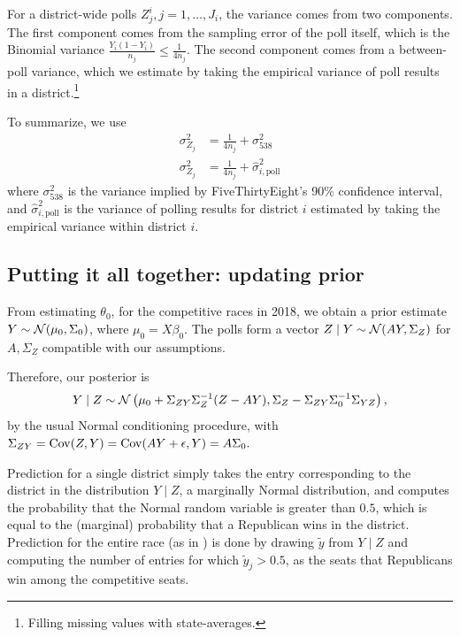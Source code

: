 \documentclass[12pt, letterpaper]{article}
\begin{document}
For a district-wide polls $Z_j^i, j = 1,\ldots,J_i$, the variance comes from two components. The first component comes from the sampling error of the poll itself, which is the Binomial variance $\frac{Y_i(1-Y_i)}{n_j} \le \frac{1}{4n_j}$. The second component comes from a between-poll variance, which we estimate by taking the empirical variance of poll results in a district.\footnote{Filling missing values with state-averages.} 

To summarize, we use \begin{align*}
\sigma^2_{Z_j} &= \frac{1}{4n_j} + \sigma^2_{538} \tag{Estimation for generic ballot poll variance}\\
\sigma^2_{Z_j} &= \frac{1}{4n_j} + \hat\sigma^2_{i,\text{poll}} \tag{Estimation for district poll variance}
\end{align*}
where $ \sigma^2_{538}$ is the variance implied by FiveThirtyEight's 90\% confidence interval, and $\hat\sigma^2_{i,\text{poll}}$ is the variance of polling results for district $i$ estimated by taking the empirical variance within district $i$.

\subsection{Putting it all together: updating prior}
\label{sub:altogether}
From estimating $\theta_0$, for the competitive races in 2018, we obtain a prior estimate $Y \sim \mathcal{N}(\mu_0, \Sigma_0)$, where $\mu_0 = X\beta_0$. The polls form a vector $Z \mid Y \sim \mathcal{N}(AY, \Sigma_Z)$ for $A, \Sigma_Z$ compatible with our assumptions. 
    
Therefore, our posterior is 
\begin{equation}
  Y\mid Z \sim \mathcal{N}\left({
\mu_0 + \Sigma_{ZY} \Sigma_Z^{-1}(Z - AY), \Sigma_Z - \Sigma_{ZY} \Sigma_0^{-1} \Sigma_{YZ}
}\right),
\label{eq:normal_cond}
\end{equation}
by the usual Normal conditioning procedure, with $\Sigma_{ZY} = \operatorname{Cov}(Z, Y) = \operatorname{Cov}(AY + \epsilon, Y) = A\Sigma_0.$

Prediction for a single district simply takes the entry corresponding to the
district in the distribution $Y \mid Z$, a marginally Normal distribution, and
computes the probability that the Normal random variable is greater than $0.5$,
which is equal to the (marginal) probability that a Republican wins in the
district. Prediction for the entire race (as in 
) is done by drawing
$\tilde y$ from $Y \mid Z$ and computing the number of entries for which
$\tilde y_j > 0.5$, as the seats that Republicans win among the competitive
seats.
\end{document}
